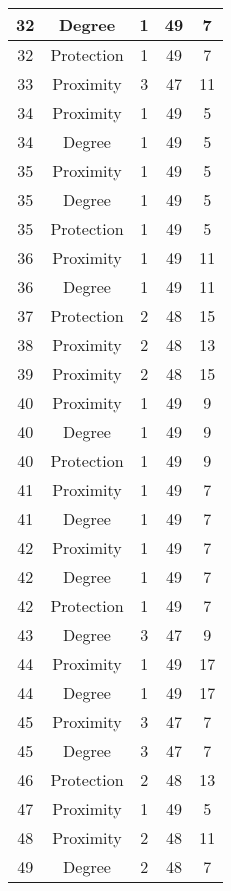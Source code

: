 \documentclass[results.tex]{subfiles}
\begin{document}
\begin{center}
\begin{tabular}{| c || c | c | c | c |}
    32 & Degree & 1 & 49 & 7 \\ 
    \hline
    32 & Protection & 1 & 49 & 7 \\ 
    \hline
    33 & Proximity & 3 & 47 & 11 \\ 
    \hline
    34 & Proximity & 1 & 49 & 5 \\ 
    \hline
    34 & Degree & 1 & 49 & 5 \\ 
    \hline
    35 & Proximity & 1 & 49 & 5 \\ 
    \hline
    35 & Degree & 1 & 49 & 5 \\ 
    \hline
    35 & Protection & 1 & 49 & 5 \\ 
    \hline
    36 & Proximity & 1 & 49 & 11 \\ 
    \hline
    36 & Degree & 1 & 49 & 11 \\ 
    \hline
    37 & Protection & 2 & 48 & 15 \\ 
    \hline
    38 & Proximity & 2 & 48 & 13 \\ 
    \hline
    39 & Proximity & 2 & 48 & 15 \\ 
    \hline
    40 & Proximity & 1 & 49 & 9 \\ 
    \hline
    40 & Degree & 1 & 49 & 9 \\ 
    \hline
    40 & Protection & 1 & 49 & 9 \\ 
    \hline
    41 & Proximity & 1 & 49 & 7 \\ 
    \hline
    41 & Degree & 1 & 49 & 7 \\ 
    \hline
    42 & Proximity & 1 & 49 & 7 \\ 
    \hline
    42 & Degree & 1 & 49 & 7 \\ 
    \hline
    42 & Protection & 1 & 49 & 7 \\ 
    \hline
    43 & Degree & 3 & 47 & 9 \\ 
    \hline
    44 & Proximity & 1 & 49 & 17 \\ 
    \hline
    44 & Degree & 1 & 49 & 17 \\ 
    \hline
    45 & Proximity & 3 & 47 & 7 \\ 
    \hline
    45 & Degree & 3 & 47 & 7 \\ 
    \hline
    46 & Protection & 2 & 48 & 13 \\ 
    \hline
    47 & Proximity & 1 & 49 & 5 \\ 
    \hline
    48 & Proximity & 2 & 48 & 11 \\ 
    \hline
    49 & Degree & 2 & 48 & 7 \\ 
    \hline   \end{tabular}
\end{center}
\end{document}
